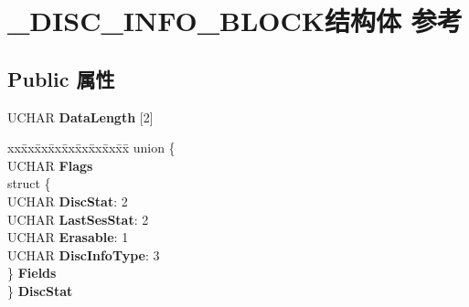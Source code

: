 \hypertarget{struct___d_i_s_c___i_n_f_o___b_l_o_c_k}{}\section{\+\_\+\+D\+I\+S\+C\+\_\+\+I\+N\+F\+O\+\_\+\+B\+L\+O\+C\+K结构体 参考}
\label{struct___d_i_s_c___i_n_f_o___b_l_o_c_k}
\subsection*{Public 属性}
\begin{DoxyCompactItemize}
\item 
\mbox{\label{struct___d_i_s_c___i_n_f_o___b_l_o_c_k_afdf422281b7f46cbaf4e994d6d0b4eb7}} 
U\+C\+H\+AR {\bfseries Data\+Length} \mbox{[}2\mbox{]}
\item 
\mbox{\label{struct___d_i_s_c___i_n_f_o___b_l_o_c_k_a76f55aacc57f67408f1220666fca8a9c}} 
\begin{tabbing}
xx\=xx\=xx\=xx\=xx\=xx\=xx\=xx\=xx\=\kill
union \{\\
\>UCHAR {\bfseries Flags}\\
\>struct \{\\
\>\>UCHAR {\bfseries DiscStat}: 2\\
\>\>UCHAR {\bfseries LastSesStat}: 2\\
\>\>UCHAR {\bfseries Erasable}: 1\\
\>\>UCHAR {\bfseries DiscInfoType}: 3\\
\>\} {\bfseries Fields}\\
\} {\bfseries DiscStat}\\


\end{tabbing}
\end{DoxyCompactItemize}
